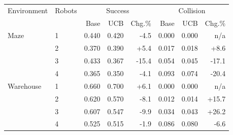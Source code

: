 \begin{tabular}{@{}llrrrrrr@{}}
\toprule
Environment & Robots & \multicolumn{3}{c}{Success} & \multicolumn{3}{c}{Collision} \\
& & Base & UCB & Chg.\% & Base & UCB & Chg.\% \\
\midrule
Maze & 1 & 0.440 & 0.420 & -4.5 & 0.000 & 0.000 & n/a \\
 & 2 & 0.370 & 0.390 & +5.4 & 0.017 & 0.018 & +8.6 \\
 & 3 & 0.433 & 0.367 & -15.4 & 0.054 & 0.045 & -17.1 \\
 & 4 & 0.365 & 0.350 & -4.1 & 0.093 & 0.074 & -20.4 \\
Warehouse & 1 & 0.660 & 0.700 & +6.1 & 0.000 & 0.000 & n/a \\
 & 2 & 0.620 & 0.570 & -8.1 & 0.012 & 0.014 & +15.7 \\
 & 3 & 0.607 & 0.547 & -9.9 & 0.034 & 0.043 & +26.2 \\
 & 4 & 0.525 & 0.515 & -1.9 & 0.086 & 0.080 & -6.6 \\
\bottomrule
\end{tabular}
